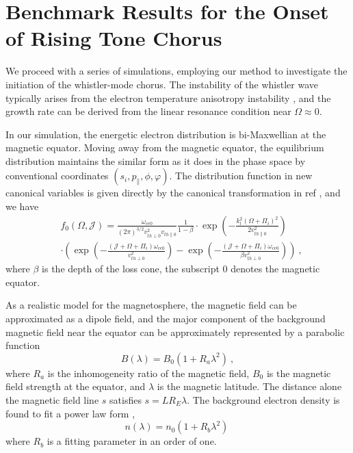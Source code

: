 \section{Benchmark Results for the Onset of Rising Tone Chorus}
\label{sec:code}
We proceed with a series of simulations, employing our method to investigate the initiation of the whistler-mode chorus. The instability of the whistler wave typically arises from the electron temperature anisotropy instability \cite{kennel1966a,kennel1966b}, and the growth rate can be derived from the linear resonance condition near $\Omega \approx 0$.

In our simulation, the energetic electron distribution is bi-Maxwellian at the magnetic equator. 
Moving away from the magnetic equator, the equilibrium distribution maintains the similar form as it does in the phase space by conventional coordinates $(s_i, p_\|, \phi, \varphi)$. The distribution function in new canonical variables is given directly by the canonical transformation in ref \cite{zheng2023a}, and we have 
\begin{equation}
    \begin{aligned}
        & f_{0}(\Omega, \mathcal{J}) =\frac{\omega_{c e 0}}{(2 \pi)^{3 / 2} v_{t h \perp 0}^2 v_{t h \| 0}} \frac{1}{1-\beta} \cdot \exp \left(-\frac{k_l^2(\Omega+\Pi_i)^2}{2 v_{t h \| 0}^2}\right) \\
        &\cdot\left(\exp \left(-\frac{(\mathcal{J}+\Omega+\Pi_i) \omega_{c e 0}}{v_{t h \perp 0}^2}\right)-\exp \left(-\frac{(\mathcal{J}+\Omega+\Pi_i) \omega_{c e 0}}{\beta v_{t h \perp 0}^2}\right)\right)~,
        \end{aligned}
\end{equation}
where $\beta$ is the depth of the loss cone, the subscript $0$ denotes the magnetic equator.

As a realistic model for the magnetosphere, the magnetic field can be approximated as a dipole field, and the major component of the background magnetic field near the equator can be approximately represented by a parabolic function \cite{tao_numerical_2014}
\begin{equation}
    B(\lambda) = B_0(1+ R_a \lambda ^2)~,
\end{equation}
where $R_a$ is the inhomogeneity ratio of the magnetic field, $B_0$ is the magnetic field strength at the equator, and $\lambda$ is the magnetic latitude. The distance alone the magnetic field line $s$ satisfies $s = L R_E \lambda$.
The background electron density is found to fit a power law form \cite{denton2004},
\begin{equation}
    n(\lambda) = n_0 (1+R_b \lambda^2)~
\end{equation}
where $R_b$ is a fitting parameter in an order of one.

